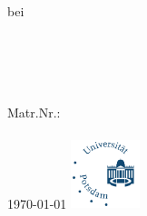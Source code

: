 \begin{titlepage}
\thispagestyle{empty}
	\begin{flushleft} \large
		\fak\\
		\lehrstuhl\\
		\lv \\
		\semester \\
		bei \lp \\[5cm]
	\end{flushleft}
	\begin{center}
		{\Large \sc \arbtyp \\[1.5cm]}
		{\Huge \bf \textsf{\titel} \\[1.5cm]}
		{\Large{
			\autorname\\
			\href{mailto:\autormail}{\autormail}\\
			Matr.Nr.: \autormatr}
			\\\textsf{}}\\			
		{\today}
		\vfill
		\includegraphics[width=2cm]{res/uni_potsdam_logo}\\ 
	\end{center}
\end{titlepage}

